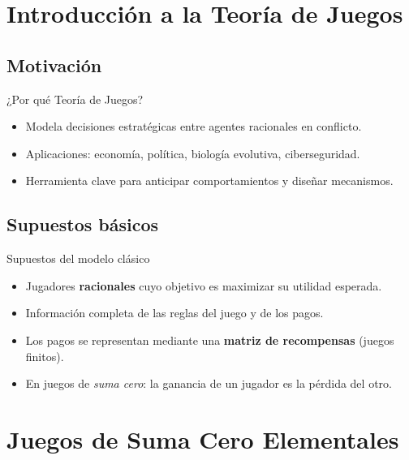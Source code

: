 \documentclass{beamer}
\begin{document}
\section{Introducción a la Teoría de Juegos}

\subsection{Motivación}
\begin{frame}{¿Por qué Teoría de Juegos?}
\begin{itemize}[<+->]  %
  \item Modela decisiones estratégicas entre agentes racionales en conflicto.
  \item Aplicaciones: economía, política, biología evolutiva, ciberseguridad.
  \item Herramienta clave para anticipar comportamientos y diseñar mecanismos.
\end{itemize}
\end{frame}

\subsection{Supuestos básicos}
\begin{frame}{Supuestos del modelo clásico}
\begin{itemize}[<+->]
  \item Jugadores \textbf{racionales} cuyo objetivo es maximizar su utilidad esperada.
  \item Información completa de las reglas del juego y de los pagos.
  \item Los pagos se representan mediante una \textbf{matriz de recompensas} (juegos finitos).
  \item En juegos de \emph{suma cero}: la ganancia de un jugador es la pérdida del otro.
\end{itemize}
\end{frame}

\section{Juegos de Suma Cero Elementales}
\end{document}
